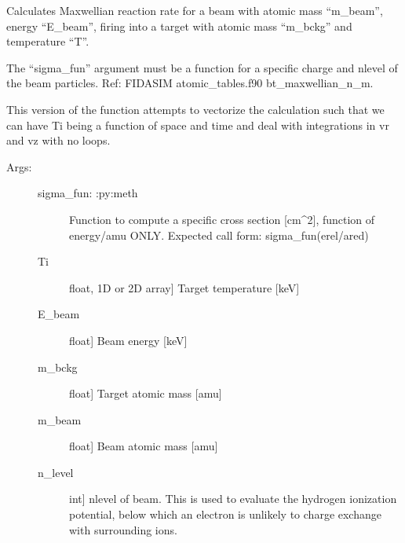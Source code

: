 \documentclass[letterpaper,10pt,english]{sphinxmanual}
\begin{document}

\begin{fulllineitems}
\label{\detokenize{aurora:aurora.nbi_neutrals.bt_rate_maxwell_average_vec}}
Calculates Maxwellian reaction rate for a beam with atomic mass “m\_beam”, 
energy “E\_beam”, firing into a target with atomic mass “m\_bckg” and temperature “T”.

The “sigma\_fun” argument must be a function for a specific charge and n\sphinxhyphen{}level of the beam particles.
Ref: FIDASIM atomic\_tables.f90 bt\_maxwellian\_n\_m.

This version of the function attempts to vectorize the calculation such that we can have Ti
being a function of space and time and deal with integrations in vr and vz with no loops.
\begin{description}
\item[{Args:}] \leavevmode\begin{description}
\item[{sigma\_fun: :py:meth}] \leavevmode
Function to compute a specific cross section {[}cm\textasciicircum{}2{]}, function of energy/amu ONLY.
Expected call form: sigma\_fun(erel/ared)

\item[{Ti}] \leavevmode{[}float, 1D or 2D array{]}
Target temperature {[}keV{]}

\item[{E\_beam}] \leavevmode{[}float{]}
Beam energy {[}keV{]}

\item[{m\_bckg}] \leavevmode{[}float{]}
Target atomic mass {[}amu{]}

\item[{m\_beam}] \leavevmode{[}float{]}
Beam atomic mass {[}amu{]}

\item[{n\_level}] \leavevmode{[}int{]}
n\sphinxhyphen{}level of beam. This is used to evaluate the hydrogen ionization potential,
below which an electron is unlikely to charge exchange with surrounding ions.


\end{description}
\end{description}
\end{fulllineitems}
\end{document}

